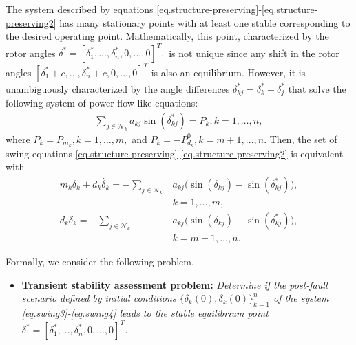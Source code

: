 \documentclass[final]{IEEEtran}
\begin{document}
The system described by equations \eqref{eq.structure-preserving}-\eqref{eq.structure-preserving2} has many stationary points with
at least one stable corresponding to the desired operating point.
Mathematically, this point, characterized by the rotor angles
$\delta^*=[\delta_1^*,...,\delta_n^*,0,...,0]^T,$ is not unique
since any shift in the rotor angles
$[\delta_1^*+c,...,\delta_n^*+c,0,...,0]^T$ is also an
equilibrium. However, it is unambiguously characterized by the
angle differences $\delta_{kj}^*=\delta_k^*-\delta_j^*$ that solve
the following system of power-flow like equations:
\begin{align}
  \label{eq.SEP}
  \sum_{j \in
  \mathcal{N}_k} a_{kj} \sin(\delta_{kj}^*) =P_{k}, k=1,\dots,n,
\end{align}
where $P_k=P_{m_k}, k=1,\dots,m,$ and $P_k=-P^0_{d_k}, k=m+1,...,n.$
Then, the set of swing equations \eqref{eq.structure-preserving}-\eqref{eq.structure-preserving2} is
equivalent with
\begin{align}
\label{eq.swing3}
  m_k \ddot{\delta_k} + d_k \dot{\delta_k} = - \sum_{j \in
  \mathcal{N}_k} &a_{kj} \big(\sin(\delta_{kj}) -\sin(\delta_{kj}^*)\big),  \\ 
  &k=1,\dots,m,  \nonumber\\
\label{eq.swing4}  
  d_k \dot{\delta_k} = - \sum_{j \in
  \mathcal{N}_k} &a_{kj} \big(\sin(\delta_{kj}) -\sin(\delta_{kj}^*)\big),   \\ 
  & k=m+1,\dots,n. \nonumber
\end{align}

Formally, we consider the following problem.

\begin{itemize}
\item [] \textbf{Transient stability assessment problem:} \emph{Determine if the post-fault scenario defined by
initial conditions $\{\delta_k(0),\dot\delta_k(0)\}_{k=1}^n$ of the system \eqref{eq.swing3}-\eqref{eq.swing4} leads to the stable
equilibrium point $\delta^*=[\delta_1^*,...,\delta_n^*,0,...,0]^T$.}
\end{itemize}
\end{document}
